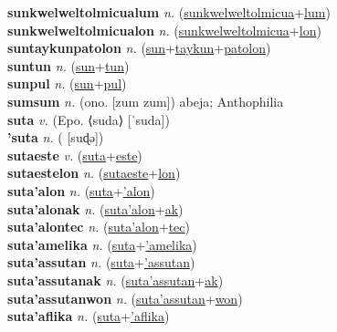 \textbf{sunkwelweltolmicualum} \textit{n.} (\hyperref[sunkwelweltolmicua]{sunkwelweltolmicua}+\hyperref[lum]{lum})
 \label{sunkwelweltolmicualum} \\
\textbf{sunkwelweltolmicualon} \textit{n.} (\hyperref[sunkwelweltolmicua]{sunkwelweltolmicua}+\hyperref[lon]{lon})
 \label{sunkwelweltolmicualon} \\
\textbf{suntaykunpatolon} \textit{n.} (\hyperref[sun]{sun}+\hyperref[taykun]{taykun}+\hyperref[patolon]{patolon})
 \label{suntaykunpatolon} \\
\textbf{suntun} \textit{n.} (\hyperref[sun]{sun}+\hyperref[tun]{tun})
 \label{suntun} \\
\textbf{sunpul} \textit{n.} (\hyperref[sun]{sun}+\hyperref[pul]{pul})
 \label{sunpul} \\
\textbf{sumsum} \textit{n.} (ono. [zum zum])
abeja; Anthophilia \label{sumsum} \\
\textbf{suta} \textit{v.} (Epo. ⟨suda⟩ [ˈsuda])
 \label{suta} \\
\textbf{'suta} \textit{n.} ( [suɖə])
 \label{'suta} \\
\textbf{sutaeste} \textit{v.} (\hyperref[suta]{suta}+\hyperref[este]{este})
 \label{sutaeste} \\
\textbf{sutaestelon} \textit{n.} (\hyperref[sutaeste]{sutaeste}+\hyperref[lon]{lon})
 \label{sutaestelon} \\
\textbf{suta'alon} \textit{n.} (\hyperref[suta]{suta}+\hyperref['alon]{'alon})
 \label{suta'alon} \\
\textbf{suta'alonak} \textit{n.} (\hyperref[suta'alon]{suta'alon}+\hyperref[ak]{ak})
 \label{suta'alonak} \\
\textbf{suta'alontec} \textit{n.} (\hyperref[suta'alon]{suta'alon}+\hyperref[tec]{tec})
 \label{suta'alontec} \\
\textbf{suta'amelika} \textit{n.} (\hyperref[suta]{suta}+\hyperref['amelika]{'amelika})
 \label{suta'amelika} \\
\textbf{suta'assutan} \textit{n.} (\hyperref[suta]{suta}+\hyperref['assutan]{'assutan})
 \label{suta'assutan} \\
\textbf{suta'assutanak} \textit{n.} (\hyperref[suta'assutan]{suta'assutan}+\hyperref[ak]{ak})
 \label{suta'assutanak} \\
\textbf{suta'assutanwon} \textit{n.} (\hyperref[suta'assutan]{suta'assutan}+\hyperref[won]{won})
 \label{suta'assutanwon} \\
\textbf{suta'aflika} \textit{n.} (\hyperref[suta]{suta}+\hyperref['aflika]{'aflika})
